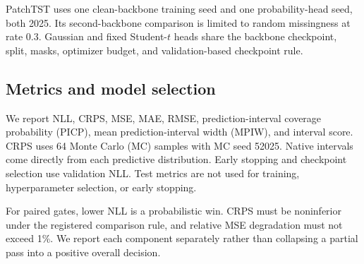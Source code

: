 PatchTST uses one clean-backbone training seed and one probability-head seed, both 2025. Its second-backbone comparison is limited to random missingness at rate 0.3. Gaussian and fixed Student-$t$ heads share the backbone checkpoint, split, masks, optimizer budget, and validation-based checkpoint rule.

\subsection{Metrics and model selection}

We report NLL, CRPS, MSE, MAE, RMSE, prediction-interval coverage probability (PICP), mean prediction-interval width (MPIW), and interval score. CRPS uses 64 Monte Carlo (MC) samples with MC seed 52025. Native intervals come directly from each predictive distribution. Early stopping and checkpoint selection use validation NLL. Test metrics are not used for training, hyperparameter selection, or early stopping.

For paired gates, lower NLL is a probabilistic win. CRPS must be noninferior under the registered comparison rule, and relative MSE degradation must not exceed 1\%. We report each component separately rather than collapsing a partial pass into a positive overall decision.
